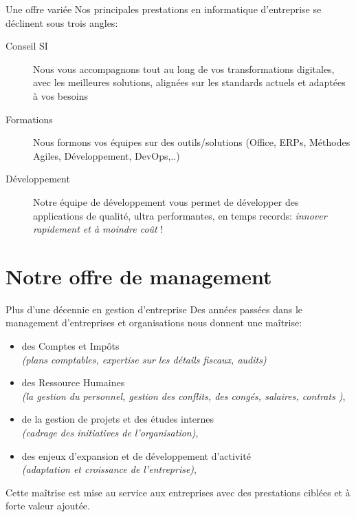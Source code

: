 \documentclass[10pt,french]{beamer}
\newcommand{\itsm}[1]{\textit{{\scriptsize #1}}}
\begin{document}
\begin{frame}[fragile]{Une offre variée}
 Nos principales prestations en informatique d'entreprise se déclinent sous trois angles:
 \begin{description}
  \item[Conseil SI]{Nous vous accompagnons tout au long de vos transformations digitales, avec les meilleures solutions, alignées sur les standards actuels et adaptées à vos besoins}
  \item[Formations]{Nous formons vos équipes sur des outils/solutions (Office, ERPs, Méthodes Agiles, Développement, DevOps,..)}
  \item[Développement]{Notre équipe de développement vous permet de développer des applications de qualité, ultra performantes, en temps records: \textsl{innover rapidement et à moindre coût} !}
 \end{description}
\end{frame}

\section{Notre offre de management}
\begin{frame}[fragile]{Plus d'une décennie en gestion d'entreprise }
 Des années passées dans le management d'entreprises et organisations nous donnent une maîtrise:
 \begin{itemize}
 	\item des Comptes et Impôts \\ \itsm{(plans comptables, expertise sur les détails fiscaux, audits)}
 	\item des Ressource Humaines \\ {\itsm{(la gestion du personnel, gestion des conflits, des congés, salaires, contrats )}},
 	\item de la gestion de projets et des études internes \\ {\itsm{(cadrage des initiatives de l'organisation)}},
 	\item des enjeux d'expansion et de développement d'activité\\  \itsm{(adaptation et croissance de l'entreprise)},
 \end{itemize}
Cette maîtrise est mise au service aux entreprises avec des prestations ciblées et à forte valeur ajoutée.
  
\end{frame}
\end{document}
